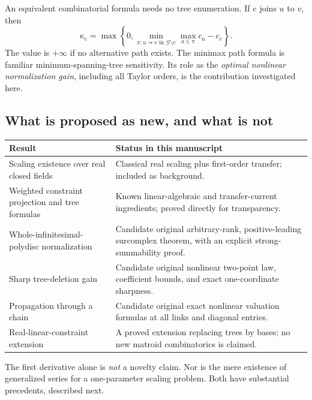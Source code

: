 \documentclass[11pt,a4paper]{article}
\numberwithin{equation}{section}
\theoremstyle{definition}
\newcommand{\GG}{\mathcal G}
\begin{document}
An equivalent combinatorial formula needs no tree enumeration. If
$e$ joins $u$ to $v$, then
\begin{equation}\label{scale:eq:overviewpath}
 \kappa_e=\max\left\{0,
 \min_{\pi:u\leadsto v\text{ in }\GG\setminus e}
       \max_{a\in\pi}c_a-c_e\right\}.
\end{equation}
The value is $+\infty$ if no alternative path exists. The minimax
path formula is familiar minimum-spanning-tree sensitivity. Its role
as the \emph{optimal nonlinear normalization gain}, including all
Taylor orders, is the contribution investigated here.

\subsection{What is proposed as new, and what is not}
\begin{center}
\begin{tabular}{@{}L{0.27\textwidth}L{0.65\textwidth}@{}}
\toprule
Result & Status in this manuscript\\
\midrule
Scaling existence over real closed fields &
Classical real scaling plus first-order transfer; included as background.\\[3pt]
Weighted constraint projection and tree formulas &
Known linear-algebraic and transfer-current ingredients; proved directly
for transparency.\\[3pt]
Whole-infinitesimal-polydisc normalization &
Candidate original arbitrary-rank, positive-leading surcomplex theorem,
with an explicit strong-summability proof.\\[3pt]
Sharp tree-deletion gain &
Candidate original nonlinear two-point law, coefficient bounds, and exact
one-coordinate sharpness.\\[3pt]
Propagation through a chain &
Candidate original exact nonlinear valuation formulas at all links and
diagonal entries.\\[3pt]
Real-linear-constraint extension &
A proved extension replacing trees by bases; no new matroid combinatorics
is claimed.\\
\bottomrule
\end{tabular}
\end{center}
The first derivative alone is \emph{not} a novelty claim. Nor is the
mere existence of generalized series for a one-parameter scaling
problem. Both have substantial precedents, described next.
\end{document}
